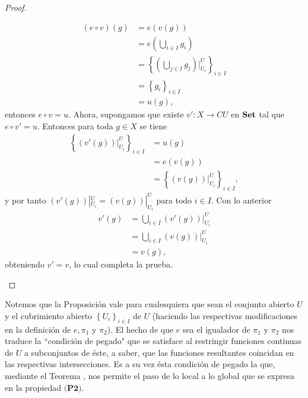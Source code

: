 \begin{proof}
\begin{itemize}
$$\begin{aligned}
            (e\circ v)(g)&=e(v(g))\\
                         &=e(\bigcup_{i\in I}g_i)\\
                         &=\left\lbrace (\bigcup_{j\in I}g_j)|^U_{U_i}\right\rbrace_{i\in I}\\
                         &=\left\lbrace g_i\right\rbrace_{i\in I}\\
                         &=u(g),
         \end{aligned}
         $$
         entonces $e\circ v=u$. Ahora, supongamos que existe $v':X\to CU$ en $\normalfont{\textbf{Set}}$ tal que $e\circ v'=u$. Entonces para toda $g\in X$ se tiene
         $$
         \begin{aligned}
            \left\lbrace (v'(g))|^U_{U_i}\right\rbrace_{i\in I}&=u(g)\\
                                                               &=e(v(g))\\
                                                               &=\left\lbrace (v(g))|^U_{U_i}\right\rbrace_{i\in I},
         \end{aligned}
         $$
         y por tanto $(v'(g))|^U_{U_i}=(v(g))|^U_{U_i}$ para todo $i\in I$. Con lo anterior
         $$
         \begin{aligned}
            v'(g)&=\bigcup_{i\in I}(v'(g))|^U_{U_i}\\
                 &=\bigcup_{i\in I}(v(g))|^U_{U_i}\\
                 &=v(g),
         \end{aligned}
         $$
         obteniendo $v'=v$, lo cual completa la prueba.  
   \end{itemize}
\end{proof}
Notemos que la Proposición  vale para cualesquiera que sean el conjunto abierto $U$ y el cubrimiento abierto $\left\lbrace U_i\right\rbrace_{i\in I}$ de $U$ (haciendo las respectivas modificaciones en la definición de $e, \pi_1$ y $\pi_2$). El hecho de que $e$ sea el igualador de $\pi_1$ y $\pi_2$ nos traduce la ``condición de pegado" que se satisface al restringir funciones continuas de $U$ a subconjuntos de éste, a saber, que las funciones resultantes coincidan en las respectivas intersecciones. Es a su vez ésta condición de pegado la que, mediante el Teorema , nos permite el paso de lo local a lo global que se expresa en la propiedad $\textbf{(P2)}$. 
